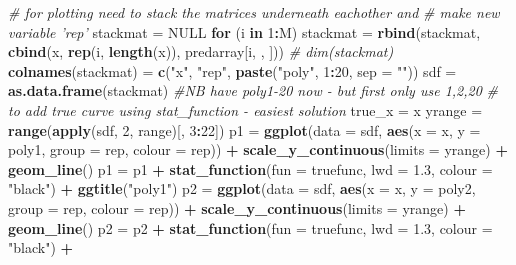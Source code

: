 \documentclass[]{article}
\newenvironment{Shaded}{\begin{snugshade}}{\end{snugshade}}
\newcommand{\KeywordTok}[1]{\textcolor[rgb]{0.13,0.29,0.53}{\textbf{#1}}}
\newcommand{\DataTypeTok}[1]{\textcolor[rgb]{0.13,0.29,0.53}{#1}}
\newcommand{\DecValTok}[1]{\textcolor[rgb]{0.00,0.00,0.81}{#1}}
\newcommand{\FloatTok}[1]{\textcolor[rgb]{0.00,0.00,0.81}{#1}}
\newcommand{\StringTok}[1]{\textcolor[rgb]{0.31,0.60,0.02}{#1}}
\newcommand{\CommentTok}[1]{\textcolor[rgb]{0.56,0.35,0.01}{\textit{#1}}}
\newcommand{\OtherTok}[1]{\textcolor[rgb]{0.56,0.35,0.01}{#1}}
\newcommand{\ControlFlowTok}[1]{\textcolor[rgb]{0.13,0.29,0.53}{\textbf{#1}}}
\newcommand{\OperatorTok}[1]{\textcolor[rgb]{0.81,0.36,0.00}{\textbf{#1}}}
\newcommand{\NormalTok}[1]{#1}
\begin{document}
\begin{Shaded}
\begin{Highlighting}[]
\CommentTok{# for plotting need to stack the matrices underneath eachother and}
\CommentTok{# make new variable 'rep'}
\NormalTok{stackmat =}\StringTok{ }\OtherTok{NULL}
\ControlFlowTok{for}\NormalTok{ (i }\ControlFlowTok{in} \DecValTok{1}\OperatorTok{:}\NormalTok{M) stackmat =}\StringTok{ }\KeywordTok{rbind}\NormalTok{(stackmat, }\KeywordTok{cbind}\NormalTok{(x, }\KeywordTok{rep}\NormalTok{(i, }\KeywordTok{length}\NormalTok{(x)), }
\NormalTok{    predarray[i, , ]))}
\CommentTok{# dim(stackmat)}
\KeywordTok{colnames}\NormalTok{(stackmat) =}\StringTok{ }\KeywordTok{c}\NormalTok{(}\StringTok{"x"}\NormalTok{, }\StringTok{"rep"}\NormalTok{, }\KeywordTok{paste}\NormalTok{(}\StringTok{"poly"}\NormalTok{, }\DecValTok{1}\OperatorTok{:}\DecValTok{20}\NormalTok{, }\DataTypeTok{sep =} \StringTok{""}\NormalTok{))}
\NormalTok{sdf =}\StringTok{ }\KeywordTok{as.data.frame}\NormalTok{(stackmat)  }\CommentTok{#NB have poly1-20 now - but first only use 1,2,20}
\CommentTok{# to add true curve using stat_function - easiest solution}
\NormalTok{true_x =}\StringTok{ }\NormalTok{x}
\NormalTok{yrange =}\StringTok{ }\KeywordTok{range}\NormalTok{(}\KeywordTok{apply}\NormalTok{(sdf, }\DecValTok{2}\NormalTok{, range)[, }\DecValTok{3}\OperatorTok{:}\DecValTok{22}\NormalTok{])}
\NormalTok{p1 =}\StringTok{ }\KeywordTok{ggplot}\NormalTok{(}\DataTypeTok{data =}\NormalTok{ sdf, }\KeywordTok{aes}\NormalTok{(}\DataTypeTok{x =}\NormalTok{ x, }\DataTypeTok{y =}\NormalTok{ poly1, }\DataTypeTok{group =}\NormalTok{ rep, }\DataTypeTok{colour =}\NormalTok{ rep)) }\OperatorTok{+}\StringTok{ }
\StringTok{    }\KeywordTok{scale_y_continuous}\NormalTok{(}\DataTypeTok{limits =}\NormalTok{ yrange) }\OperatorTok{+}\StringTok{ }\KeywordTok{geom_line}\NormalTok{()}
\NormalTok{p1 =}\StringTok{ }\NormalTok{p1 }\OperatorTok{+}\StringTok{ }\KeywordTok{stat_function}\NormalTok{(}\DataTypeTok{fun =}\NormalTok{ truefunc, }\DataTypeTok{lwd =} \FloatTok{1.3}\NormalTok{, }\DataTypeTok{colour =} \StringTok{"black"}\NormalTok{) }\OperatorTok{+}\StringTok{ }
\StringTok{    }\KeywordTok{ggtitle}\NormalTok{(}\StringTok{"poly1"}\NormalTok{)}
\NormalTok{p2 =}\StringTok{ }\KeywordTok{ggplot}\NormalTok{(}\DataTypeTok{data =}\NormalTok{ sdf, }\KeywordTok{aes}\NormalTok{(}\DataTypeTok{x =}\NormalTok{ x, }\DataTypeTok{y =}\NormalTok{ poly2, }\DataTypeTok{group =}\NormalTok{ rep, }\DataTypeTok{colour =}\NormalTok{ rep)) }\OperatorTok{+}\StringTok{ }
\StringTok{    }\KeywordTok{scale_y_continuous}\NormalTok{(}\DataTypeTok{limits =}\NormalTok{ yrange) }\OperatorTok{+}\StringTok{ }\KeywordTok{geom_line}\NormalTok{()}
\NormalTok{p2 =}\StringTok{ }\NormalTok{p2 }\OperatorTok{+}\StringTok{ }\KeywordTok{stat_function}\NormalTok{(}\DataTypeTok{fun =}\NormalTok{ truefunc, }\DataTypeTok{lwd =} \FloatTok{1.3}\NormalTok{, }\DataTypeTok{colour =} \StringTok{"black"}\NormalTok{) }\OperatorTok{+}\StringTok{ }

\end{Highlighting}
\end{Shaded}
\end{document}
